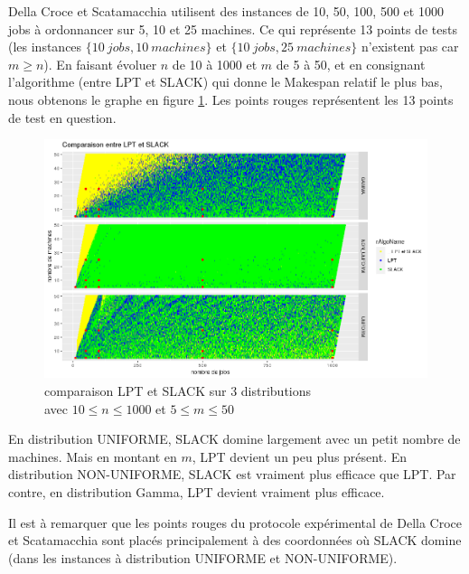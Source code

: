 \documentclass[a4paper,12pt]{report}
\theoremstyle{plain}				%
\theoremstyle{definition}				%
\begin{document}
Della Croce et Scatamacchia utilisent des instances de 10, 50, 100, 500 et 1000 jobs à ordonnancer sur 5, 10 et 25 machines. 
Ce qui représente 13 points de tests 
  (les instances 
  $\{10~jobs,10~machines\}$ et 
  $\{10~jobs,25~machines\}$ n'existent pas car $m\geq n$).
En faisant évoluer $n$ de 10 à 1000 et $m$ de 5 à 50, 
  et en consignant l'algorithme (entre LPT et SLACK) qui donne 
  le Makespan relatif le plus bas, nous obtenons le graphe en figure \ref{fig:resultatComparaisonLPTSLACK}.
Les points rouges représentent les 13 points de test en question.
 

\begin{figure}
{\centering
\includegraphics[width=\columnwidth]{8_comparaison_LPT_SLACK_2D.png}
\caption{comparaison LPT et SLACK sur 3 distributions\\
\hspace{\linewidth} avec $10\leq n \leq 1000$ et $5\leq m \leq 50$}
\label{fig:resultatComparaisonLPTSLACK}
\par}
\end{figure}


En distribution UNIFORME, SLACK domine largement avec 
  un petit nombre de machines. Mais en montant en $m$, LPT devient un peu 
  plus présent.
En distribution NON-UNIFORME, SLACK est vraiment plus efficace que LPT.
Par contre, en distribution Gamma, LPT devient vraiment plus efficace.

Il est à remarquer que les points rouges du protocole expérimental de 
  Della Croce et Scatamacchia sont placés principalement à des coordonnées
  où SLACK domine (dans les instances à distribution UNIFORME et NON-UNIFORME).
\end{document}
